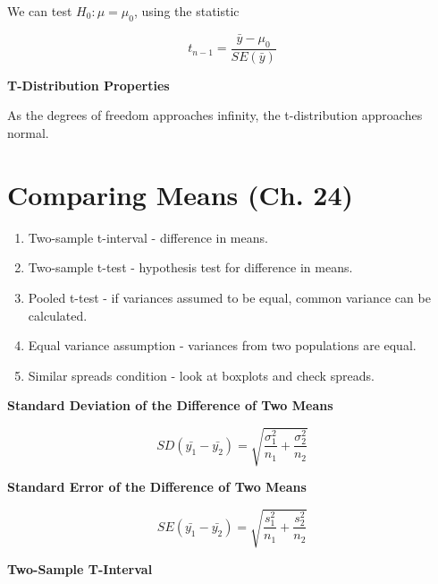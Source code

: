 \documentclass{article}
\theoremstyle{definition}
\begin{document}
We can test $H_0: \mu = \mu_0$, using the statistic

\begin{equation}
    t_{n-1} = \frac{\bar{y} - \mu_0}{SE(\bar{y})}
\end{equation}

\vspace{2ex}
\textbf{T-Distribution Properties}

As the degrees of freedom approaches infinity, the t-distribution approaches normal.

\pagebreak

\section{Comparing Means (Ch. 24)}

\begin{enumerate}[label=\textbf{\roman*.}]
    \item Two-sample t-interval - difference in means.

    \item Two-sample t-test - hypothesis test for difference in means.

    \item Pooled t-test - if variances assumed to be equal, common variance can be calculated.

    \item Equal variance assumption - variances from two populations are equal.

    \item Similar spreads condition - look at boxplots and check spreads.

\end{enumerate}

\vspace{2ex}
\textbf{Standard Deviation of the Difference of Two Means}

\begin{equation}
    SD(\bar{y_1} - \bar{y_2}) = \sqrt{\frac{\sigma_1^2}{n_1} + \frac{\sigma_2^2}{n_2}}
\end{equation}

\vspace{2ex}
\textbf{Standard Error of the Difference of Two Means}

\begin{equation}
    SE(\bar{y_1} - \bar{y_2}) = \sqrt{\frac{s_1^2}{n_1} + \frac{s_2^2}{n_2}}
\end{equation}

\vspace{2ex}
\textbf{Two-Sample T-Interval}
\end{document}
